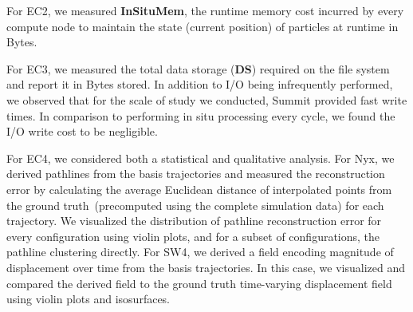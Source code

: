 \documentclass[runningheads]{llncs}
\begin{document}
For EC2, we measured \textbf{InSituMem}, the runtime memory cost incurred by every compute node to maintain the state (current position) of particles at runtime in Bytes.
%

For EC3, we measured the total data storage (\textbf{DS}) required on the file system and report it in Bytes stored.
%
In addition to I/O being infrequently performed, we observed that for the scale of study we conducted, Summit provided fast write times.
%
In comparison to performing in situ processing every cycle, we found the I/O write cost to be negligible. %

For EC4, we considered both a statistical and qualitative analysis.
%
For Nyx, we derived pathlines from the basis trajectories and measured the reconstruction error by calculating the average Euclidean distance of interpolated points from the ground truth~(precomputed using the complete simulation data) for each trajectory.
%
We visualized the distribution of pathline reconstruction error for every configuration using violin plots, and for a subset of configurations, the pathline clustering directly.
%
For SW4, we derived a field encoding magnitude of displacement over time from the basis trajectories.
%
In this case, we visualized and compared the derived field to the ground truth time-varying displacement field using violin plots and isosurfaces.

\vspace{-2mm}
\end{document}
